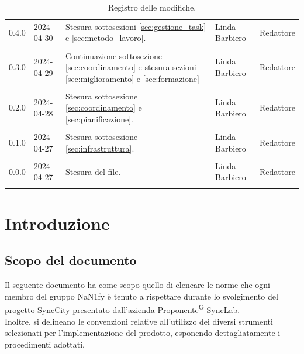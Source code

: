 \documentclass[8pt]{article}
\newcommand{\glossterm}[1]{#1\textsuperscript{G}} %
\begin{document}
\begin{table}[ht!]
\begin{tabular}{p{1.2cm} p{2cm} p{6cm} p{3cm} p{2cm}}
      0.4.0 & 2024-04-30 & Stesura sottosezioni \ref{sec:gestione_task} e \ref{sec:metodo_lavoro}. & Linda Barbiero & Redattore \\\\ %
		0.3.0 & 2024-04-29 & Continuazione sottosezione \ref{sec:coordinamento} e
      stesura sezioni \ref{sec:miglioramento} e \ref{sec:formazione} & Linda Barbiero & Redattore \\\\ %
      0.2.0 & 2024-04-28 & Stesura sottosezione \ref{sec:coordinamento} e \ref{sec:pianificazione}. & Linda Barbiero & Redattore \\\\ %
      0.1.0 & 2024-04-27 & Stesura sottosezione \ref{sec:infrastruttura}. & Linda Barbiero & Redattore \\\\ %
		0.0.0 & 2024-04-27 & Stesura del file. & Linda Barbiero & Redattore \\\\ %
		\bottomrule
	\end{tabular}
	\caption{Registro delle modifiche.}
	\label{table:Registro delle modifiche}
\end{table}
\newpage
{\hypersetup{hidelinks} \tableofcontents}
\clearpage
\newpage
{\hypersetup{hidelinks} \listoffigures}
\newpage
{\hypersetup{hidelinks} \listoftables}
\newpage
\justifying
\section{Introduzione} \label{sec:intro}
\subsection{Scopo del documento}
Il seguente documento ha come scopo quello di elencare le norme che ogni membro del gruppo NaN1fy è
tenuto a rispettare durante lo svolgimento del progetto SyncCity presentato dall'azienda
\glossterm{Proponente} SyncLab.\\
Inoltre, si delineano le convenzioni relative all'utilizzo dei diversi strumenti selezionati per l'implementazione del prodotto, esponendo dettagliatamente i procedimenti adottati.
\end{document}
